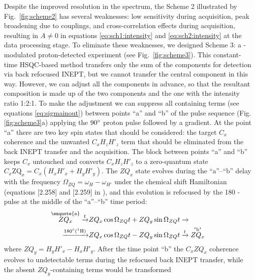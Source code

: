 \documentclass[twocolumn]{svjour3}           %
\begin{document}
Despite the improved resolution in the \clab{} spectrum, the Scheme 2 
illustrated by Fig.~\ref{fig:scheme2} has several weaknesses: low 
sensitivity during 
\clab{} acquisition, peak bro\-ade\-ning due to \oneJcc{} couplings, and 
cross-correlation effects during \clab{} acquisition, resulting in 
$A \ne 0$ in equations \eqref{eq:sch1:intensity} and \eqref{eq:sch2:intensity} 
at the data processing stage. 
To eliminate these weaknesses, 
we designed Scheme 3: a \oneJch-modulated proton-de\-tec\-ted experiment 
(see Fig.~\ref{fig:scheme3}). This constant-time {HSQC}-based method 
transfers only the sum 
of the \qouter{} components \TermOuter{} for detection via back refocused 
{INEPT}, but we cannot transfer the central component in this way. However, 
we can adjust all the components in advance, so that the resultant 
composition is made up of the two \qouter{} components and the \qinner{} one with the intensity ratio 1:2:1. 
To make the adjustment we can suppress all \hlab{} containing terms 
(see equations \eqref{eq:sigmainout})
between points \enquote{a} and \enquote{b} of the pulse sequence (Fig. \ref{fig:scheme3}a) 
applying the $90\degree$ proton pulse followed by a gradient. 
At the point \enquote{a} there are two key spin states that should be considered: the target 
$C_x$ coherence and the unwanted $C_x H_z H'_z$ term that should
be eliminated from the back INEPT transfer and the acquisition. The block between points 
\enquote{a} and \enquote{b} keeps $C_x$ untouched and converts $C_x H_z H'_z$ 
to a zero-quantum state 
$C_x \text{ZQ}_x =  C_x (H_x H'_x + H_y H'_y)$.
The $ZQ_x$ state evolves during the \enquote{a}--\enquote{b} delay with the frequency
$\Omega_{ZQ}=\omega_{H}-\omega_{H'}$ under the chemical shift Hamiltonian
(equations [2.258] and [2.259] in 
\cite{cavanagh_protein_2007}), and
this evolution is refocused by the 180\degree{} \hlab-pulse at the middle of the 
\enquote{a}--\enquote{b} time period:
\begin{align}
  \overset{\text{\enquote{a}}}{ZQ_x}  
    \xrightarrow{t} & ZQ_x \cos \Omega_{ZQ}t + ZQ_y \sin \Omega_{ZQ}t
    \xrightarrow{} \nonumber \\
    \xrightarrow{\text{180\degree (\hlab)}} & 
      ZQ_x \cos \Omega_{ZQ}t - ZQ_y \sin \Omega_{ZQ}t
      \xrightarrow{t} \overset{\text{"b"}}{ZQ_x}
\end{align}
where $ZQ_y = H_y H'_x - H_x H'_y$. 
After the time point \enquote{b} the $C_x ZQ_x$ coherence evolves to undetectable 
terms during the refocused 
back INEPT transfer, while the absent $ZQ_y$-containing terms would be transformed 
\end{document}
